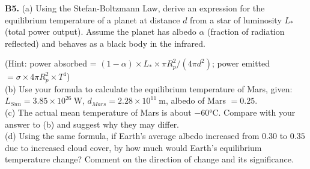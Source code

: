 \begin{exercisebox}[16]
\vspace{0.4cm}

\textbf{B5.} (a) Using the Stefan-Boltzmann Law,
derive an expression for the equilibrium temperature
of a planet at distance $d$ from a star of luminosity
$L_*$ (total power output). Assume the planet has
albedo $\alpha$ (fraction of radiation reflected)
and behaves as a black body in the infrared.

(Hint: power absorbed = $(1-\alpha) \times L_*
\times \pi R_p^2 / (4\pi d^2)$; power emitted
$= \sigma \times 4\pi R_p^2 \times T^4$)\\[4pt]
(b) Use your formula to calculate the equilibrium
temperature of Mars, given:
$L_{Sun} = 3.85\times10^{26}\ \text{W}$,
$d_{Mars} = 2.28\times10^{11}\ \text{m}$,
albedo of Mars $= 0.25$.\\[4pt]
(c) The actual mean temperature of Mars is about
$-60°\text{C}$. Compare with your answer to (b)
and suggest why they may differ.\\[4pt]
(d) Using the same formula, if Earth's average
albedo increased from $0.30$ to $0.35$ due to
increased cloud cover, by how much would Earth's
equilibrium temperature change? Comment on the
direction of change and its significance.
\hfill{}

\end{exercisebox}
